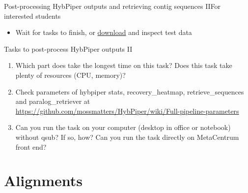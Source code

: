 \documentclass[compress,  xelatex, 11pt, xcolor=x11names, aspectratio=169,
	hyperref={
		bookmarks=true,
		unicode=true,
		colorlinks=true,
		pdftitle={HybSeq course},
		plainpages=false,
		pdfauthor={Vojtech Zeisek},
		pdfsubject={Practical processing of HybSeq target enrichment sequencing data on computing grids like MetaCentrum},
		pdfcreator={XeLaTeX},
		pdfkeywords={BASH, command line, GNU, HybSeq, Linux, MetaCentrum, sequencing shell, target enrichment},
		linkcolor=Turquoise4, %
		anchorcolor=DodgerBlue4, %
		citecolor=DodgerBlue4, %
		filecolor=DodgerBlue4, %
		menucolor=Tan4, %
		urlcolor=DarkOliveGreen4 %
		},
	url={hyphens, lowtilde} %
	]{beamer}
\renewcommand{\texttt}[1]{\colorbox{Cornsilk2}{{\ttfamily #1}}}
\begin{document}
\begin{frame}{Post-processing HybPiper outputs and retrieving contig sequences II}{For interested students}
	\vfill
	\begin{itemize}
		\item Wait for tasks to finish, or \href{https://botany.natur.cuni.cz/zeisek/hybseq_course_zingibers_2_hybpiper.zip}{download} and inspect test data
	\end{itemize}
	\vfill
	\begin{exampleblock}{Tasks to post-process HybPiper outputs II}
		\begin{enumerate}
			\item Which part does take the longest time on this task? Does this task take plenty of resources (CPU, memory)?
			\item Check parameters of \texttt{hybpiper stats}, \texttt{recovery\_heatmap}, \texttt{retrieve\_sequences} and \texttt{paralog\_retriever} at \url{https://github.com/mossmatters/HybPiper/wiki/Full-pipeline-parameters}
			\item Can you run the task on your computer (desktop in office or notebook) without \texttt{qsub}? If so, how? Can you run the task directly on MetaCentrum front end?
		\end{enumerate}
	\end{exampleblock}
	\vfill
\end{frame}

\section{Alignments}
\end{document}
